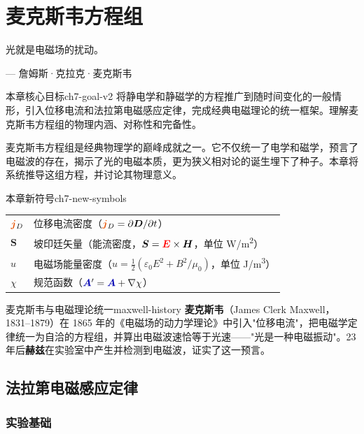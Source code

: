 \documentclass[11pt,a4paper,openany,oneside]{book}
\newcommand{\vecE}{\textcolor{red}{\vect{E}}}
\newcommand{\vecJ}{\textcolor{cororange}{\vect{j}}}
\newcommand{\vecA}{\textcolor{blue!70!black}{\vect{A}}}
\newcommand{\eps}{\varepsilon}
\newcommand{\muz}{\mu_0}
\newcommand{\vect}[1]{\bm{#1}}
\newcommand{\grad}{\nabla}
\begin{document}
\chapter{麦克斯韦方程组}
\epigraph{光就是电磁场的扰动。}{--- 詹姆斯·克拉克·麦克斯韦}

\hypertarget{ch7-goal}{}\begin{insight}{本章核心目标}{ch7-goal-v2}
将静电学和静磁学的方程推广到随时间变化的一般情形，引入位移电流和法拉第电磁感应定律，完成经典电磁理论的统一框架。理解麦克斯韦方程组的物理内涵、对称性和完备性。
\end{insight}

麦克斯韦方程组是经典物理学的巅峰成就之一。它不仅统一了电学和磁学，预言了电磁波的存在，揭示了光的电磁本质，更为狭义相对论的诞生埋下了种子。本章将系统推导这组方程，并讨论其物理意义。

\begin{tip}{本章新符号}{ch7-new-symbols}
\begin{tabular}{@{}ll@{}}
$\vecJ_D$ & 位移电流密度（$\vecJ_D = \partial\vect{D}/\partial t$） \\
$\vect{S}$ & 坡印廷矢量（能流密度，$\vect{S} = \vecE \times \vect{H}$，单位 \si{W/m^2}） \\
$u$ & 电磁场能量密度（$u = \frac{1}{2}(\eps_0 E^2 + B^2/\muz)$，单位 \si{J/m^3}） \\
$\chi$ & 规范函数（$\vecA' = \vecA + \grad\chi$） \\
\end{tabular}
\end{tip}

\begin{history}{麦克斯韦与电磁理论统一}{maxwell-history}
\textbf{麦克斯韦}（James Clerk Maxwell，1831--1879）在 1865 年的《电磁场的动力学理论》中引入"位移电流"，把电磁学定律统一为自洽的方程组，并算出电磁波速恰等于光速——"光是一种电磁振动"。23 年后\textbf{赫兹}在实验室中产生并检测到电磁波，证实了这一预言。
\end{history}

\section{法拉第电磁感应定律}

\subsection{实验基础}
\end{document}
